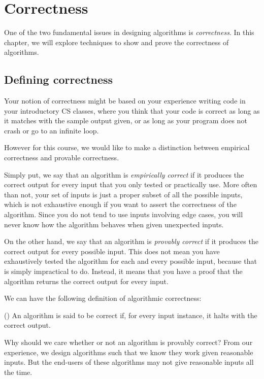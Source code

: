 \chapter{Correctness}
\label{chap:correctness}

One of the two fundamental issues in designing algorithms is \textit{correctness}. In this chapter, we will explore techniques to show and prove the correctness of algorithms.

\section{Defining correctness}
Your notion of correctness might be based on your experience writing code in your introductory CS classes, where you think that your code is correct as long as it matches with the sample output given, or as long as your program does not crash or go to an infinite loop.

However for this course, we would like to make a distinction between empirical correctness and provable correctness.

Simply put, we say that an algorithm is \textit{empirically correct} if it produces the correct output for every input that you only tested or practically use. More often than not, your set of inputs is just a proper subset of all the possible inputs, which is not exhaustive enough if you want to assert the correctness of the algorithm. Since you do not tend to use inputs involving edge cases, you will never know how the algorithm behaves when given unexpected inputs.

On the other hand, we say that an algorithm is \textit{provably correct} if it produces the correct output for every possible input. This does not mean you have exhaustively tested the algorithm for each and every possible input, because that is simply impractical to do. Instead, it means that you have a proof that the algorithm returns the correct output for every input.

We can have the following definition of algorithmic correctness:
\begin{definition}{(\cite{cormen_introduction_2009})}
An algorithm is said to be correct if, for every input instance, it halts with the correct output.
\end{definition}

Why should we care whether or not an algorithm is provably correct? From our experience, we design algorithms such that we know they work given reasonable inputs. But the end-users of these algorithms may not give reasonable inputs all the time.

